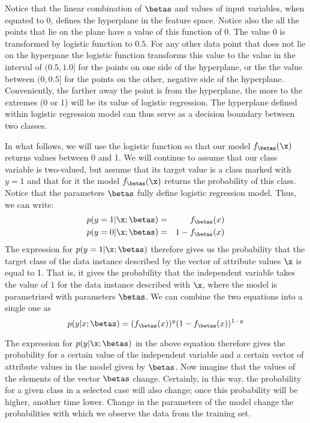 \begin{refsection}
Notice that the linear combination of $\betas$ and values of input variables, when equated to $0$, defines the hyperplane in the feature space. Notice also the all the points that lie on the plane have a value of this function of $0$. The value $0$ is transformed by logistic function to $0.5$. For any other data point that does not lie on the hyperpane the logistic function transforms this value to the value in the interval of $(0.5, 1.0]$ for the points on one side of the hyperplane, or the the value between $(0, 0.5]$ for the points on the other, negative side of the hyperplane. Conveniently, the farther away the point is from the hyperplane, the more to the extremes (0 or 1) will be its value of logistic regression. The hyperplane defined within logistic regression model can thus serve as a decision boundary between two classes.

In what follows, we will use the logistic function so that our model $f_{\betas}(\x)$ returns values between 0 and 1. We will continue to assume that our class variable is two-valued, but assume that its target value is a class marked with $y=1$ and that for it the model $f_{\betas} (\x)$ returns the probability of this class. Notice that the parameters $\betas$ fully define logistic regression model. Thus, we can write:
\begin{eqnarray}
  p(y=1|\x;\betas) & = & f_{\betas}(x) \\
  p(y=0|\x;\betas) & = & 1-f_{\betas}(x)
\end{eqnarray}
The expression for $p(y=1|\x;\betas) $ therefore gives us the probability that the target class of the data instance described by the vector of attribute values $\x$ is equal to 1. That is, it gives the probability that the independent variable takes the value of $1$ for the data instance described with $\x$, where the model is parametrized with parameters $\betas$. We can combine the two equations into a single one as
\begin{equation}
  p(y|x;\betas) = (f_{\betas}(x))^y(1-f_{\betas}(x))^{1-y}
\label{eq:log-prob}
\end{equation}

The expression for $p(y|\x;\betas) $ in the above equation therefore gives the probability for a certain value of the independent variable and a certain vector of attribute values in the model given by $\betas$. Now imagine that the values of the elements of the vector $\betas$ change. Certainly, in this way, the probability for a given class in a selected case will also change; once this probability will be higher, another time lower. Change in the parameters of the model change the probabilities with which we observe the data from the training set.


\end{refsection}

